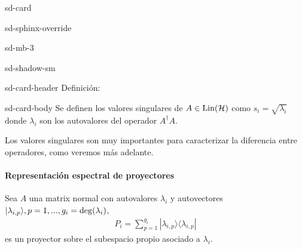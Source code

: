 \documentclass[letterpaper,10pt,english]{jupyterBook}
\newcommand{\bra}[1]{\langle #1|}
\newcommand{\ket}[1]{|#1\rangle}
\newcommand{\Hil}{{\cal H}}
\newcommand{\Lin}{\hbox{Lin}}
\begin{document}
\begin{sphinxuseclass}{sd-card}
\begin{sphinxuseclass}{sd-sphinx-override}
\begin{sphinxuseclass}{sd-mb-3}
\begin{sphinxuseclass}{sd-shadow-sm}
\begin{sphinxuseclass}{sd-card-header}
\sphinxAtStartPar
Definición:

\end{sphinxuseclass}
\begin{sphinxuseclass}{sd-card-body}
\sphinxAtStartPar
Se definen los valores singulares de  \(A\in \Lin(\Hil)\) como \(s_i =\sqrt{\lambda_i}\) donde \(\lambda_i\) son los autovalores del operador \(A^\dagger A\).

\end{sphinxuseclass}
\end{sphinxuseclass}
\end{sphinxuseclass}
\end{sphinxuseclass}
\end{sphinxuseclass}
\sphinxAtStartPar
Los valores singulares son muy importantes para caracterizar la diferencia entre operadores, como veremos más adelante.


\paragraph{Representación espectral de proyectores}
\label{\detokenize{docs/Part_01_Formalismo/Chapter_01_02_Formalismo_matem_xe1tico/01_03_Operadores_myst:representacion-espectral-de-proyectores}}
\sphinxAtStartPar
Sea \(A\) una matrix normal con autovalores  \(\lambda_i\) y autovectores \(\ket{\lambda_{i,p}}, p=1,...,g_i= {\rm deg}(\lambda_i)\),
\begin{equation*}
\begin{split}
P_i = \sum_{p=1}^{g_i} \ket{\lambda_{i,p}}\bra{\lambda_{i,p}} 
\end{split}
\end{equation*}
\sphinxAtStartPar
es un proyector sobre el subespacio propio asociado a  \(\lambda_i\).
\end{document}
